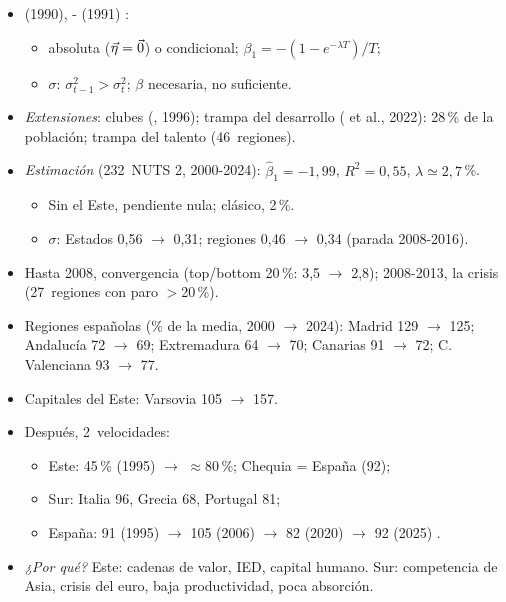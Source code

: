 \documentclass{article}
\begin{document}
\begin{columnas}
\begin{itemize}
\item {} (1990), - (1991) :
  \begin{itemize}
  \item absoluta ($\vec{\eta}=\vec{0}$) o condicional; $\beta_1=-(1-e^{-\lambda T})/T$;
  \item $\sigma$: $\sigma^2_{t-1}>\sigma^2_{t}$; $\beta$ necesaria, no suficiente.
  \end{itemize}
\item \emph{Extensiones}: clubes (, 1996); trampa del desarrollo ( et al., 2022): 28\,\% de la población; trampa del talento (46~regiones).
\item \emph{Estimación} (232~NUTS 2, 2000-2024): $\hat\beta_1=-1{,}99$, $R^2=0{,}55$, $\lambda\simeq2{,}7$\,\%.
  \begin{itemize}
  \item Sin el Este, pendiente nula; clásico, 2\,\%.
  \item $\sigma$: Estados 0,56 $\to$ 0,31; regiones 0,46 $\to$ 0,34 (parada 2008-2016).
  \end{itemize}
\end{itemize}

\begin{itemize}
\item Hasta 2008, convergencia (top/bottom 20\,\%: 3,5 $\to$ 2,8); 2008-2013, la crisis (27~regiones con paro $>$20\,\%).
\item Regiones españolas (\% de la media, 2000 $\to$ 2024): Madrid 129 $\to$ 125; Andalucía 72 $\to$ 69; Extremadura 64 $\to$ 70; Canarias 91 $\to$ 72; C. Valenciana 93 $\to$ 77.
\item Capitales del Este: Varsovia 105 $\to$ 157.
\item Después, 2~velocidades:
  \begin{itemize}
  \item Este: 45\,\% (1995) $\to$ $\approx$80\,\%; Chequia = España (92);
  \item Sur: Italia 96, Grecia 68, Portugal 81;
  \item España: 91 (1995) $\to$ 105 (2006) $\to$ 82 (2020) $\to$ 92 (2025) .
  \end{itemize}
\item \emph{¿Por qué?} Este: cadenas de valor, IED, capital humano. Sur: competencia de Asia, crisis del euro, baja productividad, poca absorción.
\end{itemize}


\end{columnas}
\end{document}
